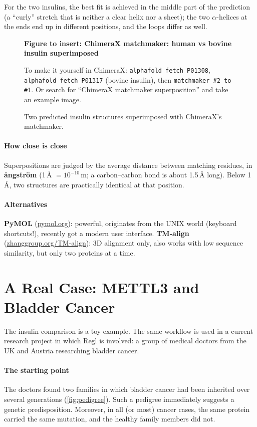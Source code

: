\documentclass[11pt, oneside]{book}
\newcommand{\figureplaceholder}[5]{%
\begin{figure}[htbp]
\centering
\begin{tcolorbox}[unbreakable,width=\linewidth,height=#1,colback=accent!3,
  colframe=accent!30,boxrule=0.5pt,arc=2.5mm,sharp corners=all,
  valign=center,halign=center,fontupper=\small]
{\bfseries\color{accent}Figure to insert: #2}\par\medskip
{\color{gray!75!black}#3}
\end{tcolorbox}
\caption{#4}\label{#5}
\end{figure}}
\let\originalsection\section
\renewcommand{\section}{\Needspace{7\baselineskip}\originalsection}
\begin{document}
For the two insulins, the best fit is achieved in the middle part of the
prediction (a ``curly'' stretch that is neither a clear helix nor a sheet); the
two $\alpha$-helices at the ends end up in different positions, and the loops
differ as well.

\figureplaceholder{4.5cm}{ChimeraX matchmaker: human vs bovine insulin superimposed}%
{To make it yourself in ChimeraX: \texttt{alphafold fetch P01308},
\texttt{alphafold fetch P01317} (bovine insulin), then
\texttt{matchmaker \#2 to \#1}. Or search for ``ChimeraX matchmaker
superposition'' and take an example image.}%
{Two predicted insulin structures superimposed with ChimeraX's matchmaker.}%
{fig:chimerax-insulin}

\paragraph{How close is close}
Superpositions are judged by the average distance between matching residues,
in \textbf{\aa ngstr\"om} (1\,\AA{} $= 10^{-10}$\,m; a carbon--carbon bond is
about 1.5\,\AA{} long). Below 1\,\AA{}, two structures are practically
identical at that position.

\paragraph{Alternatives}
\textbf{PyMOL} (\url{pymol.org}): powerful, originates from the UNIX world
(keyboard shortcuts!), recently got a modern user interface. \textbf{TM-align}
(\url{zhanggroup.org/TM-align}): 3D alignment only, also works with low
sequence similarity, but only two proteins at a time.

\section{A Real Case: METTL3 and Bladder Cancer}
\label{sec:mettl3}

The insulin comparison is a toy example. The same workflow is used in a
current research project in which Regl is involved: a group of medical doctors
from the UK and Austria researching bladder cancer.

\paragraph{The starting point}
The doctors found two families in which bladder cancer had been inherited over
several generations (\cref{fig:pedigree}). Such a pedigree immediately suggests
a genetic predisposition. Moreover, in all (or most) cancer cases, the same
protein carried the same mutation, and the healthy family members did not.
\end{document}
